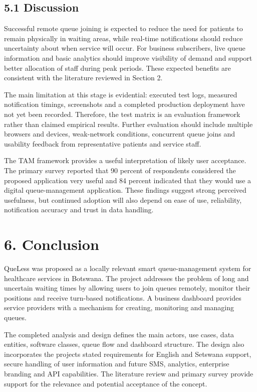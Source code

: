 \documentclass[
]{article}
\begin{document}
\subsection{5.1 Discussion}\label{discussion}

Successful remote queue joining is expected to reduce the need for
patients to remain physically in waiting areas, while real-time
notifications should reduce uncertainty about when service will occur.
For business subscribers, live queue information and basic analytics
should improve visibility of demand and support better allocation of
staff during peak periods. These expected benefits are consistent with
the literature reviewed in Section 2.

The main limitation at this stage is evidential: executed test logs,
measured notification timings, screenshots and a completed production
deployment have not yet been recorded. Therefore, the test matrix is an
evaluation framework rather than claimed empirical results. Further
evaluation should include multiple browsers and devices, weak-network
conditions, concurrent queue joins and usability feedback from
representative patients and service staff.

The TAM framework provides a useful interpretation of likely user
acceptance. The primary survey reported that 90 percent of respondents
considered the proposed application very useful and 84 percent indicated
that they would use a digital queue-management application. These
findings suggest strong perceived usefulness, but continued adoption
will also depend on ease of use, reliability, notification accuracy and
trust in data handling.

\section{6. Conclusion}\label{conclusion}

QueLess was proposed as a locally relevant smart queue-management system
for healthcare services in Botswana. The project addresses the problem
of long and uncertain waiting times by allowing users to join queues
remotely, monitor their positions and receive turn-based notifications.
A business dashboard provides service providers with a mechanism for
creating, monitoring and managing queues.

The completed analysis and design defines the main actors, use cases,
data entities, software classes, queue flow and dashboard structure. The
design also incorporates the project\textquotesingle s stated
requirements for English and Setswana support, secure handling of user
information and future SMS, analytics, enterprise branding and API
capabilities. The literature review and primary survey provide support
for the relevance and potential acceptance of the concept.
\end{document}

